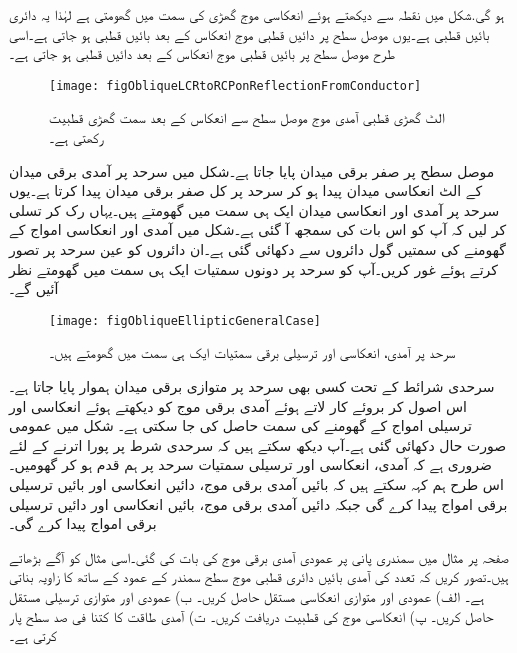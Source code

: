 ہو گی.شکل  میں نقطہ  سے دیکھتے ہوئے انعکاسی موج گھڑی کی سمت میں گھومتی ہے لہٰذا یہ دائری بائیں قطبی ہے۔یوں موصل سطح پر دائیں قطبی موج انعکاس کے بعد بائیں قطبی ہو جاتی ہے۔اسی طرح موصل سطح پر بائیں قطبی موج انعکاس کے بعد دائیں قطبی ہو جاتی ہے۔
\begin{figure}
\centering
\texttt{[image: figObliqueLCRtoRCPonReflectionFromConductor]}
\caption{الٹ گھڑی قطبی آمدی موج موصل سطح سے انعکاس کے بعد سمت گھڑی قطبیت رکھتی ہے۔}
\label{شکل_قطبیت_الٹ_گھڑی_سے_سمت_گھڑی_قطبیت}
\end{figure}

موصل سطح پر صفر برقی میدان پایا جاتا ہے۔شکل  میں سرحد پر آمدی برقی میدان کے الٹ انعکاسی میدان پیدا ہو کر سرحد پر کل صفر برقی میدان پیدا کرتا ہے۔یوں سرحد پر آمدی اور انعکاسی میدان ایک ہی سمت میں گھومتے ہیں۔یہاں رک کر تسلی کر لیں کہ آپ کو اس بات کی سمجھ آ گئی ہے۔شکل میں آمدی اور انعکاسی امواج کے گھومنے کی سمتیں گول دائروں سے دکھائی گئی ہے۔ان دائروں کو عین سرحد پر تصور کرتے ہوئے غور کریں۔آپ کو سرحد پر دونوں سمتیات ایک ہی سمت میں گھومتے نظر آئیں گے۔   
 
\begin{figure}
\centering
\texttt{[image: figObliqueEllipticGeneralCase]}
\caption{سرحد پر آمدی، انعکاسی اور ترسیلی برقی سمتیات ایک ہی سمت میں گھومتے ہیں۔}
\label{شکل_قطبیت_عمومی_صورت}
\end{figure}

سرحدی شرائط کے تحت کسی بھی سرحد پر متوازی برقی میدان ہموار پایا جاتا ہے۔اس اصول کر بروئے کار لاتے ہوئے آمدی برقی موج کو دیکھتے ہوئے انعکاسی اور ترسیلی امواج کے گھومنے کی سمت حاصل کی جا سکتی ہے۔ شکل  میں عمومی صورت حال دکھائی گئی ہے۔آپ دیکھ سکتے ہیں کہ سرحدی شرط پر پورا اترنے کے لئے ضروری ہے کہ آمدی، انعکاسی اور ترسیلی سمتیات سرحد پر ہم قدم ہو کر گھومیں۔ اس طرح ہم کہہ سکتے ہیں کہ بائیں آمدی برقی موج، دائیں انعکاسی اور بائیں ترسیلی برقی امواج پیدا کرے گی جبکہ دائیں آمدی برقی موج، بائیں انعکاسی اور دائیں ترسیلی برقی امواج پیدا کرے گی۔ 

صفحہ  پر مثال  میں سمندری پانی
  پر عمودی آمدی برقی موج کی بات کی گئی۔اسی مثال کو آگے بڑھاتے ہیں۔تصور کریں کہ  تعدد کی آمدی بائیں دائری قطبی موج سطح سمندر کے عمود کے ساتھ  کا زاویہ بناتی ہے۔ الف) عمودی اور متوازی انعکاسی مستقل حاصل کریں۔ ب) عمودی اور متوازی ترسیلی مستقل حاصل کریں۔ پ) انعکاسی موج کی قطبیت دریافت کریں۔ ت) آمدی طاقت کا کتنا فی صد سطح پار کرتی ہے۔


